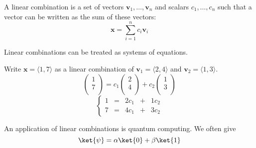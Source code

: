 \begin{definition}
    A linear combination is a set of vectors \(\mathbf{v}_1,\ldots,\mathbf{v} _n\) and scalars \(c_1,\ldots,c_n\) such that a vector can be written as the sum of these vectors: 
    \[
        \mathbf{x} =\sum_{i=1}^n c_{i} \mathbf{v} _i  
    \]
\end{definition}
Linear combinations can be treated as systems of equations.
\begin{eg}
    Write \(\mathbf{x} =\langle 1,7 \rangle \) as a linear combination of \(\mathbf{v} _1 =\langle 2,4 \rangle \) and \(\mathbf{v} _2 =\langle 1,3 \rangle \).
    \[
        \begin{pmatrix}
             1 \\
              7\\
        \end{pmatrix}=c_1\begin{pmatrix}
             2 \\
              4\\
        \end{pmatrix}+c_2 \begin{pmatrix}
             1 \\
              3\\
        \end{pmatrix}
    \]
    \[
        \left\{
            \begin{array}{ccccc}
                1&=&2c_1&+&1c_2\\
                7&=&4c_1&+&3c_2
            \end{array}
        \right.
    \]
\end{eg}
\begin{remark}
    An application of linear combinations is quantum computing. We often give 
    \[
        \ket{\psi }=\alpha \ket{0}+\beta \ket{1}
    \]
\end{remark}
